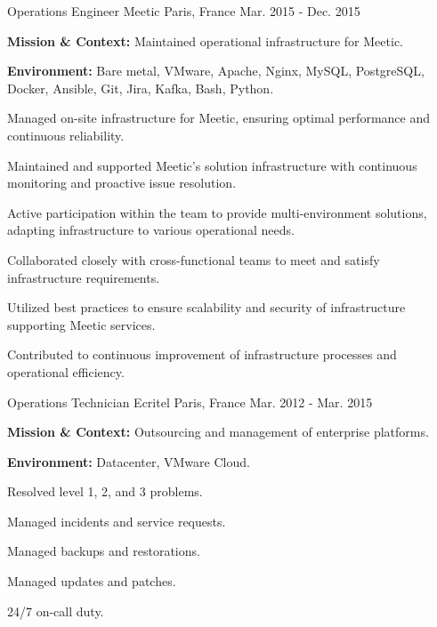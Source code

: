 \begin{cventries}
\cventry
{Operations Engineer} %
{Meetic} %
{Paris, France} %
{Mar. 2015 - Dec. 2015} %
{
  \begin{cvitems} %
    \item {\textbf{Mission \& Context:} Maintained operational infrastructure for Meetic.}
    \item {\textbf{Environment:} Bare metal, VMware, Apache, Nginx, MySQL, PostgreSQL, Docker, Ansible, Git, Jira, Kafka, Bash, Python.}
    \item {Managed on-site infrastructure for Meetic, ensuring optimal performance and continuous reliability.}
    \item {Maintained and supported Meetic's solution infrastructure with continuous monitoring and proactive issue resolution.}
    \item {Active participation within the team to provide multi-environment solutions, adapting infrastructure to various operational needs.}
    \item {Collaborated closely with cross-functional teams to meet and satisfy infrastructure requirements.}
    \item {Utilized best practices to ensure scalability and security of infrastructure supporting Meetic services.}
    \item {Contributed to continuous improvement of infrastructure processes and operational efficiency.}
  \end{cvitems}
}

\cventry
{Operations Technician} %
{Ecritel} %
{Paris, France} %
{Mar. 2012 - Mar. 2015} %
{
  \begin{cvitems} %
    \item {\textbf{Mission \& Context:} Outsourcing and management of enterprise platforms.}
    \item {\textbf{Environment:} Datacenter, VMware Cloud.}
    \item {Resolved level 1, 2, and 3 problems.}
    \item {Managed incidents and service requests.}
    \item {Managed backups and restorations.}
    \item {Managed updates and patches.}
    \item {24/7 on-call duty.}
  \end{cvitems}
}


\end{cventries}
